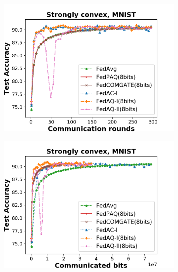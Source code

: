 \begin{figure}[hbt!]%
    \centering
    \begin{subfigure}[b]{0.31\textwidth}
    \includegraphics[width=\textwidth]{figure/accuracy_iid_comm_str_cvx.png}
    \end{subfigure}
    \begin{subfigure}[b]{0.31\textwidth}
    \includegraphics[width=\textwidth]{figure/accuracy_iid_bits_str_cvx.png}
    \end{subfigure}
    \begin{subfigure}[b]{0.31\textwidth}

\end{subfigure}
\end{figure}
